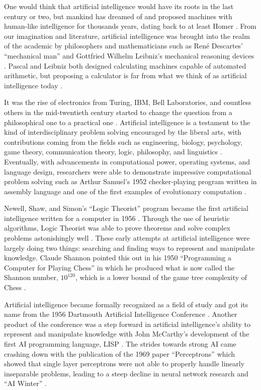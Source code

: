 \documentclass[oneside,12pt,openany]{book}
\begin{document}
	
	One would think that artificial intelligence would have its roots in the last century or two, but mankind has dreamed of and proposed machines with human-like intelligence for thousands years, dating back to at least Homer \cite{Buchanan}. From our imagination and literature, artificial intelligence was brought into the realm of the academic by philosophers and mathematicians such as Ren\'e Descartes' ``mechanical man'' and Gottfried Wilhelm Leibniz's mechanical reasoning devices \cite{Buchanan}. Pascal and Leibniz both designed calculating machines capable of automated arithmetic, but proposing a calculator is far from what we think of as artificial intelligence today  \cite{Buchanan}.
	
	It was the rise of electronics from Turing, IBM, Bell Laboratories, and countless others in the mid-twentieth century started to change the question from a philosophical one to a practical one \cite{Buchanan}. Artificial intelligence is a testament to the kind of interdisciplinary problem solving encouraged by the liberal arts, with contributions coming from the fields such as engineering, biology, psychology, game theory, communication theory, logic, philosophy, and linguistics \cite{Buchanan}. Eventually, with advancements in computational power, operating systems, and language design, researchers were able to demonstrate impressive  computational problem solving such as Arthur Samuel's 1952 checker-playing program written in assembly language and one of the first examples of evolutionary computation \cite{Buchanan}. 
	
	Newell, Shaw, and Simon's ``Logic Theorist'' program became the first artificial intelligence written for a computer in 1956 \cite{Gugerty}. Through the use of heuristic algorithms, Logic Theorist was able to prove theorems and solve complex problems astonishingly well \cite{Gugerty}. These early attempts at artificial intelligence were largely doing two things: searching and finding ways to represent and manipulate knowledge. Claude Shannon pointed this out in his 1950 ``Programming a Computer for Playing Chess'' in which he produced what is now called the Shannon number, $10^{120}$, which is a lower bound of the game tree complexity of Chess \cite{Jones}.
	
	Artificial intelligence became formally recognized as a field of study and got its name from the 1956 Dartmouth Artificial Intelligence Conference \cite{Buchanan}. Another product of the conference was a step forward in artificial intelligence's ability to represent and manipulate knowledge with John McCarthy's development of the first AI programming language, LISP \cite{Jones}. The strides towards strong AI came crashing down with the publication of the 1969 paper ``Perceptrons'' which showed that single layer perceptrons were not able to properly handle linearly inseparable problems, leading to a steep decline in neural network research and ``AI Winter'' \cite{Jones}.
	
\end{document}
